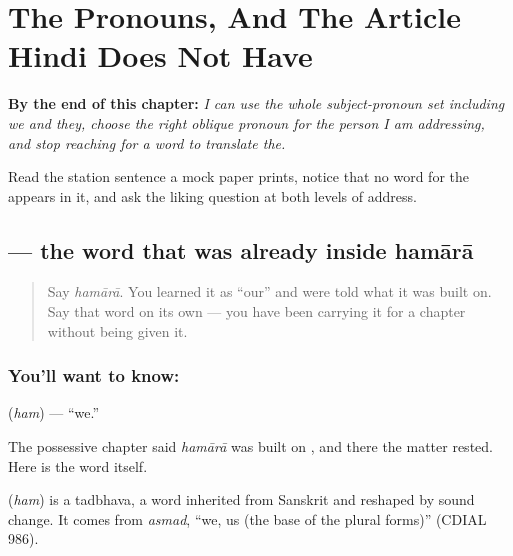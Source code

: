 
\chapter{The Pronouns, And The Article Hindi Does Not Have}
\label{ch:hi-sarvanam}

\begin{chapteropening}
\textbf{By the end of this chapter:} \emph{I can use the whole subject-pronoun set including we and they, choose the right oblique pronoun for the person I am addressing, and stop reaching for a word to translate the.}

Read the station sentence a mock paper prints, notice that no word for the appears in it, and ask the liking question at both levels of address.
\end{chapteropening}

\section[\texorpdfstring{\hi{हम} (ham)}{हम (ham)}]{ — the word that was already inside hamārā}

\label{lesson:HI-C86-ham}



\begin{quote}
Say \emph{hamārā}. You learned it as \textquotedblleft{}our\textquotedblright{} and were told what it was built on. Say that word on its own — you have been carrying it for a chapter without being given it.
\end{quote}

\subsection*{You'll want to know: }
\textbf{} (\emph{ham}) — \textquotedblleft{}we.\textquotedblright{}

The possessive chapter said \emph{hamārā} was built on \textbf{}, and there the matter rested. Here is the word itself.

\begin{cousinweb}
\textbf{} (\emph{ham}) is a tadbhava, a word inherited from Sanskrit and reshaped by sound change. It comes from \emph{asmad}, \textquotedblleft{}we, us (the base of the plural forms)\textquotedblright{} (CDIAL 986).
\end{cousinweb}

